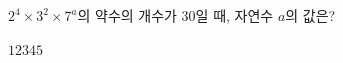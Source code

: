 $2^4\times 3^2\times 7^a$의 약수의 개수가 30일 때, 자연수 $a$의 값은?
\begin{choices32}{$1$}{$2$}{$3$}{$4$}{$5$}\end{choices32}
